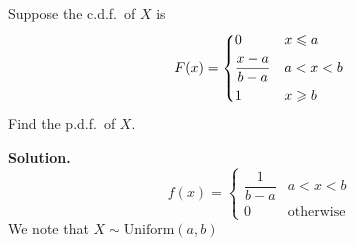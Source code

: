 \begin{Example}{}{}
    Suppose the c.d.f.\ of $ X $ is
    \[ F(x)=\begin{dcases}
            0               & x\leqslant a \\
            \frac{x-a}{b-a} & a<x<b        \\
            1               & x\geqslant b
        \end{dcases} \]
    Find the p.d.f.\ of $ X $.

    \textbf{Solution.}
    \[ f(x)=
        \begin{cases}
            \dfrac{1}{b-a} & a<x<b            \\
            0              & \text{otherwise}
        \end{cases} \]
    We note that $ X \sim \text{Uniform}(a,b) $
\end{Example}

